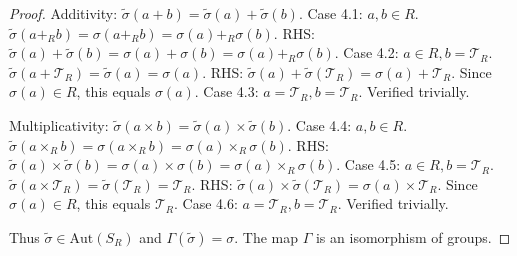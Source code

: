 \documentclass[11pt, a4paper]{article}
\theoremstyle{plain}
\theoremstyle{definition}
\numberwithin{equation}{section}
\newcommand{\Tobj}{\mathcal{T}} %
\newcommand{\Aut}{\mathrm{Aut}}
\newcommand{\SR}{S_{R}}
\begin{document}
\begin{proof}
Additivity: $\tilde{\sigma}(a+b) = \tilde{\sigma}(a)+\tilde{\sigma}(b)$.
Case 4.1: $a, b \in R$. $\tilde{\sigma}(a+_{R}b) = \sigma(a+_{R}b) = \sigma(a)+_{R}\sigma(b)$.
RHS: $\tilde{\sigma}(a)+\tilde{\sigma}(b) = \sigma(a)+\sigma(b) = \sigma(a)+_R\sigma(b)$.
Case 4.2: $a \in R, b=\Tobj_R$. $\tilde{\sigma}(a+\Tobj_R) = \tilde{\sigma}(a) = \sigma(a)$.
RHS: $\tilde{\sigma}(a)+\tilde{\sigma}(\Tobj_R) = \sigma(a)+\Tobj_R$. Since $\sigma(a) \in R$, this equals $\sigma(a)$.
Case 4.3: $a=\Tobj_R, b=\Tobj_R$. Verified trivially.

Multiplicativity: $\tilde{\sigma}(a\times b) = \tilde{\sigma}(a)\times\tilde{\sigma}(b)$.
Case 4.4: $a, b \in R$. $\tilde{\sigma}(a\times_{R}b) = \sigma(a\times_{R}b) = \sigma(a)\times_{R}\sigma(b)$.
RHS: $\tilde{\sigma}(a)\times\tilde{\sigma}(b) = \sigma(a)\times\sigma(b) = \sigma(a)\times_R\sigma(b)$.
Case 4.5: $a \in R, b=\Tobj_R$. $\tilde{\sigma}(a\times\Tobj_R) = \tilde{\sigma}(\Tobj_R) = \Tobj_R$.
RHS: $\tilde{\sigma}(a)\times\tilde{\sigma}(\Tobj_R) = \sigma(a)\times\Tobj_R$. Since $\sigma(a) \in R$, this equals $\Tobj_R$.
Case 4.6: $a=\Tobj_R, b=\Tobj_R$. Verified trivially.

Thus $\tilde{\sigma} \in \Aut(\SR)$ and $\Gamma(\tilde{\sigma})=\sigma$.
The map $\Gamma$ is an isomorphism of groups.
\end{proof}
\end{document}

